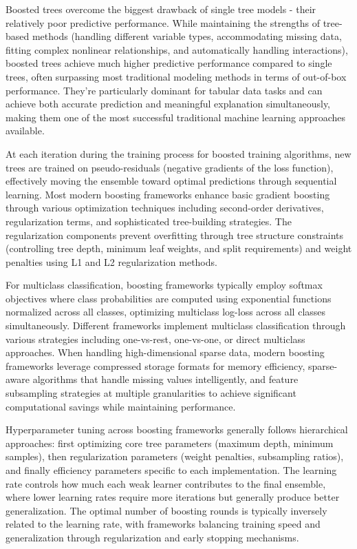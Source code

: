\documentclass[
  titlepage]{article}
\begin{document}
Boosted trees overcome the biggest drawback of single tree models -
their relatively poor predictive performance. While maintaining the
strengths of tree-based methods (handling different variable types,
accommodating missing data, fitting complex nonlinear relationships, and
automatically handling interactions), boosted trees achieve much higher
predictive performance compared to single trees, often surpassing most
traditional modeling methods in terms of out-of-box performance. They're
particularly dominant for tabular data tasks and can achieve both
accurate prediction and meaningful explanation simultaneously, making
them one of the most successful traditional machine learning approaches
available.

At each iteration during the training process for boosted training
algorithms, new trees are trained on pseudo-residuals (negative
gradients of the loss function), effectively moving the ensemble toward
optimal predictions through sequential learning. Most modern boosting
frameworks enhance basic gradient boosting through various optimization
techniques including second-order derivatives, regularization terms, and
sophisticated tree-building strategies. The regularization components
prevent overfitting through tree structure constraints (controlling tree
depth, minimum leaf weights, and split requirements) and weight
penalties using L1 and L2 regularization methods.

For multiclass classification, boosting frameworks typically employ
softmax objectives where class probabilities are computed using
exponential functions normalized across all classes, optimizing
multiclass log-loss across all classes simultaneously. Different
frameworks implement multiclass classification through various
strategies including one-vs-rest, one-vs-one, or direct multiclass
approaches. When handling high-dimensional sparse data, modern boosting
frameworks leverage compressed storage formats for memory efficiency,
sparse-aware algorithms that handle missing values intelligently, and
feature subsampling strategies at multiple granularities to achieve
significant computational savings while maintaining performance.

Hyperparameter tuning across boosting frameworks generally follows
hierarchical approaches: first optimizing core tree parameters (maximum
depth, minimum samples), then regularization parameters (weight
penalties, subsampling ratios), and finally efficiency parameters
specific to each implementation. The learning rate controls how much
each weak learner contributes to the final ensemble, where lower
learning rates require more iterations but generally produce better
generalization. The optimal number of boosting rounds is typically
inversely related to the learning rate, with frameworks balancing
training speed and generalization through regularization and early
stopping mechanisms.
\end{document}
